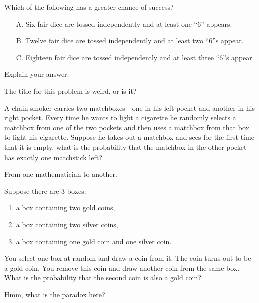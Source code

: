 \documentclass[solution,addpoints,12pt]{exam}
\begin{document}
\begin{questions}
\begin{parts}
\end{parts}
 

\question [1] Which of the following has a greater chance of success?

\begin{itemize}
    \item[A.] Six fair dice are tossed independently and at least one “6” appears.
    \item[B.]  Twelve fair dice are tossed independently and at least two “6”s appear.
    \item[C.] Eighteen fair dice are tossed independently and at least three “6”s appear.
\end{itemize}
Explain your answer.
\begin{solution} 
 The title for this problem is weird, or is it?
\end{solution}

\question [1] A chain smoker carries two matchboxes - one in his left pocket and another in his right pocket. Every time he wants to light a cigarette he randomly selects a matchbox from one of the two pockets and then uses a matchbox from that box to light his cigarette. Suppose he takes out a matchbox and sees for the first time that it is empty, what is the probability that the matchbox in the other pocket has exactly one matchstick left?
\begin{solution} 
 From one mathematician to another.
\end{solution}


\question[1] Suppose there are 3 boxes:
\begin{enumerate}
    \item a box containing two gold coins,
    \item a box containing two silver coins,
    \item a box containing one gold coin and one silver coin.
\end{enumerate}
You select one box at random and draw a coin from it. The coin turns out to be a gold coin. You remove this coin and draw another coin from the same box. What is the probability that the second coin is also a gold coin?
\begin{solution} 
 Hmm, what is the paradox here?
\end{solution}



\end{questions}
\end{document}
